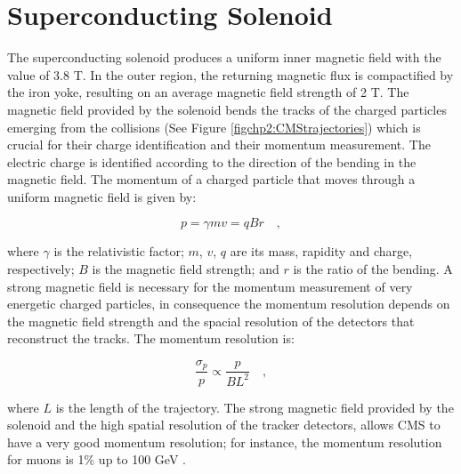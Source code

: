 \section{Superconducting Solenoid}
\label{sec:Solenoid}

The superconducting solenoid produces a uniform inner magnetic 
field with the value of 3.8 T. In the outer region, the 
returning magnetic flux is compactified by the iron yoke, resulting 
on an average magnetic field strength of 2 T. The magnetic field 
provided by the solenoid bends the tracks of the charged particles 
emerging from the collisions (See Figure \ref{figchp2:CMStrajectories}) which is crucial
for their charge identification and their momentum measurement. The electric charge 
is identified according to the direction of the
bending in the magnetic field. The momentum of a charged particle 
that moves through a uniform magnetic field is given by:

\begin{equation}
p = \gamma m v = qBr\quad, 
\end{equation}

where $\gamma$ is the relativistic factor; $m$, $v$, $q$ are its mass,
rapidity and charge, respectively; $B$ is the magnetic field strength; and $r$ is the ratio 
of the bending. A strong magnetic field is necessary for the momentum 
measurement of very energetic charged particles, in consequence the momentum resolution 
depends on the magnetic field strength and the spacial resolution of the detectors 
that reconstruct the tracks. The momentum resolution is:

\begin{equation}
 \frac{\sigma_{p}}{p} \propto \frac{p}{BL^{2}}\quad,
\end{equation}

where $L$ is the length of the trajectory. The strong magnetic field provided by the solenoid 
and the high spatial resolution of the tracker detectors, allows CMS to have 
a very good momentum resolution; for instance, the momentum resolution for muons 
is 1$\%$ up to 100 GeV \cite{chp2:CMSTDR2}.\\


